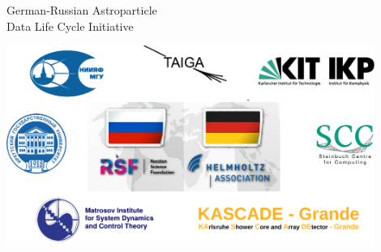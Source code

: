 
\begin{frame}{German-Russian Astroparticle \\Data Life Cycle Initiative\footnotemark[1]}
\vspace{-1.4em}
\begin{center}
  \includegraphics[width=0.9\textwidth]{pics/Collab-4.pdf}
\end{center}
\footnotesize{}
\end{frame}



